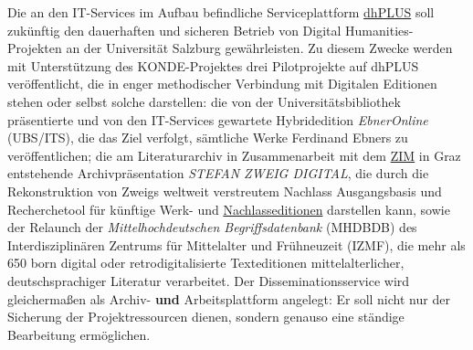 \documentclass{article}
\begin{document}
        Die an den IT-Services im Aufbau befindliche Serviceplattform \href{http://gams.uni-graz.at/o:konde.68}{dhPLUS} soll zukünftig den dauerhaften und sicheren Betrieb von Digital Humanities-Projekten an der Universität Salzburg gewährleisten. Zu diesem Zwecke werden mit Unterstützung des KONDE-Projektes drei Pilotprojekte auf dhPLUS veröffentlicht, die in enger methodischer Verbindung mit Digitalen Editionen stehen oder selbst solche darstellen: die von der Universitätsbibliothek präsentierte und von den IT-Services gewartete Hybridedition \emph{EbnerOnline} (UBS/ITS), die das Ziel verfolgt, sämtliche Werke Ferdinand Ebners zu veröffentlichen; die am Literaturarchiv in Zusammenarbeit mit dem \href{http://gams.uni-graz.at/o:konde.217}{ZIM} in Graz entstehende Archivpräsentation \emph{STEFAN ZWEIG DIGITAL}, die durch die Rekonstruktion von Zweigs weltweit verstreutem Nachlass Ausgangsbasis und Recherchetool für künftige Werk- und \href{http://gams.uni-graz.at/o:konde.140}{Nachlasseditionen} darstellen kann, sowie der Relaunch der \emph{Mittelhochdeutschen Begriffsdatenbank} (MHDBDB) des Interdisziplinären Zentrums für Mittelalter und Frühneuzeit (IZMF), die mehr als 650 born digital oder retrodigitalisierte Texteditionen mittelalterlicher, deutschsprachiger Literatur verarbeitet. Der Disseminationsservice wird gleichermaßen als Archiv- \textbf{und}  Arbeitsplattform angelegt: Er soll nicht nur der Sicherung der Projektressourcen dienen, sondern genauso eine ständige Bearbeitung ermöglichen.\\
            
\end{document}
